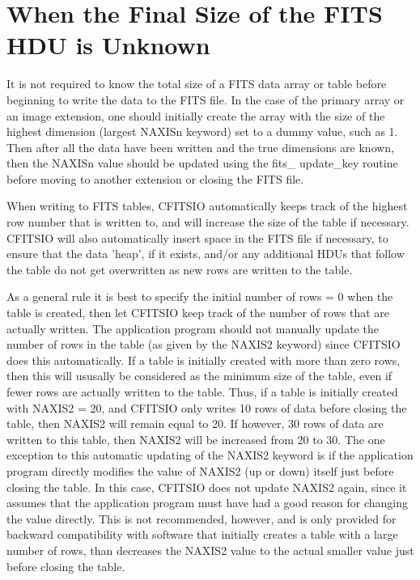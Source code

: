 \documentclass[11pt]{book}
\begin{document}
\section{When the Final Size of the FITS HDU is Unknown}

It is not required to know the total size of a FITS data array or table
before beginning to write the data to the FITS file.  In the case of
the primary array or an image extension, one should initially create
the array with the size of the highest dimension (largest NAXISn
keyword) set to a dummy value, such as 1.  Then after all the data have
been written and the true dimensions are known, then the NAXISn value
should be updated using the fits\_ update\_key routine before moving to
another extension or closing the FITS file.

When writing to FITS tables, CFITSIO automatically keeps track of the
highest row number that is written to, and will increase the size of
the table if necessary.  CFITSIO will also automatically insert space
in the FITS file if necessary, to ensure that the data 'heap', if it
exists, and/or any additional HDUs that follow the table do not get
overwritten as new rows are written to the table.

As a general rule it is best to specify the initial number of rows = 0
when the table is created, then let CFITSIO keep track of the number of
rows that are actually written.  The application program should not
manually update the number of rows in the table (as given by the NAXIS2
keyword) since CFITSIO does this automatically.  If a table is
initially created with more than zero rows, then this will ususally be
considered as the minimum size of the table, even if fewer rows are
actually written to the table.  Thus, if a table is initially created
with NAXIS2 = 20, and CFITSIO only writes 10 rows of data before
closing the table, then NAXIS2 will remain equal to 20.  If however, 30
rows of data are written to this table, then NAXIS2 will be increased
from 20 to 30.  The one exception to this automatic updating of the
NAXIS2 keyword is if the application program directly modifies the
value of NAXIS2 (up or down) itself just before closing the table.  In this
case, CFITSIO does not update NAXIS2 again, since it assumes that the
application program must have had a good reason for changing the value
directly.  This is not recommended, however, and is only provided for
backward compatibility with software that initially creates a table
with a large number of rows, than decreases the NAXIS2 value to the
actual smaller value just before closing the table.
\end{document}
